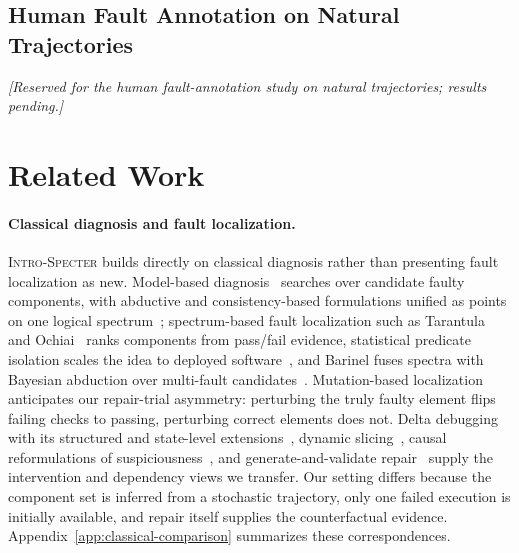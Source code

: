 \documentclass{article}
\newcommand{\method}{\textsc{Intro-Specter}\xspace}
\begin{document}

\subsection{Human Fault Annotation on Natural Trajectories}\label{sec:human-annotation}
\emph{[Reserved for the human fault-annotation study on natural trajectories; results pending.]}

\section{Related Work}\label{sec:related}

\paragraph{Classical diagnosis and fault localization.}
\method builds directly on classical diagnosis rather than presenting fault localization as new. Model-based diagnosis~\citep{reiter1987diagnosis,dekleer1987gde} searches over candidate faulty components, with abductive and consistency-based formulations unified as points on one logical spectrum~\citep{console1991spectrum}; spectrum-based fault localization such as Tarantula and Ochiai~\citep{jones2005tarantula,abreu2006ochiai,wong2016survey} ranks components from pass/fail evidence, statistical predicate isolation scales the idea to deployed software~\citep{liblit2005scalable}, and Barinel fuses spectra with Bayesian abduction over multi-fault candidates~\citep{abreu2009barinel}. Mutation-based localization~\citep{papadakis2015metallaxis,moon2014muse} anticipates our repair-trial asymmetry: perturbing the truly faulty element flips failing checks to passing, perturbing correct elements does not. Delta debugging with its structured and state-level extensions~\citep{zeller2002delta,misherghi2006hdd,cleve2005causes}, dynamic slicing~\citep{weiser1981slicing,korel1988dynslicing,agrawal1990dynslicing}, causal reformulations of suspiciousness~\citep{halpern2005causes,baah2010causal}, and generate-and-validate repair~\citep{legoues2012genprog,mechtaev2016angelix} supply the intervention and dependency views we transfer. Our setting differs because the component set is inferred from a stochastic trajectory, only one failed execution is initially available, and repair itself supplies the counterfactual evidence. Appendix~\ref{app:classical-comparison} summarizes these correspondences.
\end{document}
